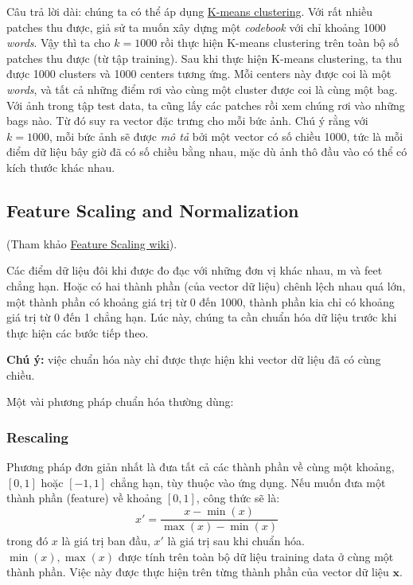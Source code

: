 Câu trả lời dài: chúng ta có thể áp dụng \href{http://machinelearningcoban.com/2017/01/01/kmeans/}{K-means clustering}. Với rất nhiều patches thu được, giả sử ta muốn xây dựng một \textit{codebook} với chỉ khoảng 1000 \textit{words}. Vậy thì ta cho $k = 1000$ rồi thực hiện K-means clustering trên toàn bộ số patches thu được (từ tập training). Sau khi thực hiện K-means clustering, ta thu được 1000 clusters và 1000 centers tương ứng. Mỗi centers này được coi là một \textit{words}, và tất cả những điểm rơi vào cùng một cluster được coi là cùng một bag. Với ảnh trong tập test data, ta cũng lấy các patches rồi xem chúng rơi vào những bags nào. Từ đó suy ra vector đặc trưng cho mỗi bức ảnh. Chú ý rằng với $k = 1000$, mỗi bức ảnh sẽ được \textit{mô tả} bởi một vector có số chiều 1000, tức là mỗi điểm dữ liệu bây giờ đã có số chiều bằng nhau, mặc dù ảnh thô đầu vào có thể có kích thước khác nhau. 
 
\subsection{Feature Scaling and Normalization}
(Tham khảo \href{https://en.wikipedia.org/wiki/Feature_scaling}{Feature Scaling wiki}). 
 
Các điểm dữ liệu đôi khi được đo đạc với những đơn vị khác nhau, m và feet chẳng hạn. Hoặc có hai thành phần (của vector dữ liệu) chênh lệch nhau quá lớn, một thành phần có khoảng giá trị từ 0 đến 1000, thành phần kia chỉ có khoảng giá trị từ 0 đến 1 chẳng hạn. Lúc này, chúng ta cần chuẩn hóa dữ liệu trước khi thực hiện các bước tiếp theo.  
 
\textbf{Chú ý:} việc chuẩn hóa này chỉ được thực hiện khi vector dữ liệu đã có cùng chiều. 
 
Một vài phương pháp chuẩn hóa thường dùng: 
 
\subsubsection{Rescaling }
Phương pháp đơn giản nhất là đưa tất cả các thành phần về cùng một khoảng, $[0, 1]$ hoặc $[-1, 1]$ chẳng hạn, tùy thuộc vào ứng dụng. Nếu muốn đưa một thành phần (feature) về khoảng $[0, 1]$, công thức sẽ là:  
\begin{equation*} 
x' = \frac{x - \min(x)}{\max(x) - \min(x)} 
\end{equation*} 
trong đó $x$ là giá trị ban đầu, $x'$ là giá trị sau khi chuẩn hóa. $\min(x), \max(x)$ được tính trên toàn bộ dữ liệu training data ở cùng một thành phần. Việc này được thực hiện trên từng thành phần của vector dữ liệu $\mathbf{x}$.  
 
